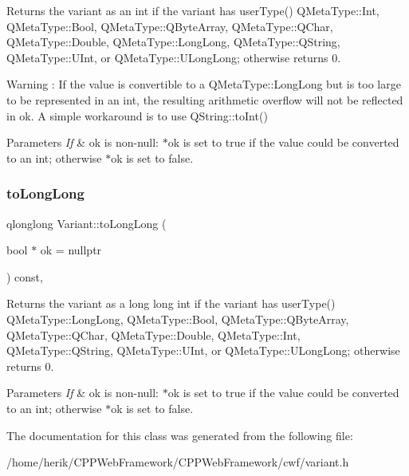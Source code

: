 Returns the variant as an int if the variant has user\+Type() Q\+Meta\+Type\+::\+Int, Q\+Meta\+Type\+::\+Bool, Q\+Meta\+Type\+::\+Q\+Byte\+Array, Q\+Meta\+Type\+::\+Q\+Char, Q\+Meta\+Type\+::\+Double, Q\+Meta\+Type\+::\+Long\+Long, Q\+Meta\+Type\+::\+Q\+String, Q\+Meta\+Type\+::\+U\+Int, or Q\+Meta\+Type\+::\+U\+Long\+Long; otherwise returns 0. 

\begin{DoxyWarning}{Warning}
\+: If the value is convertible to a Q\+Meta\+Type\+::\+Long\+Long but is too large to be represented in an int, the resulting arithmetic overflow will not be reflected in ok. A simple workaround is to use Q\+String\+::to\+Int() 
\end{DoxyWarning}

\begin{DoxyParams}{Parameters}
{\em If} & ok is non-\/null\+: $\ast$ok is set to true if the value could be converted to an int; otherwise $\ast$ok is set to false. \\
\hline
\end{DoxyParams}
\mbox{\label{class_variant_ad6c7084a71cb3189d302160a160bb36b}} 
\subsubsection{\texorpdfstring{to\+Long\+Long}{toLongLong}}
{\footnotesize\ttfamily qlonglong Variant\+::to\+Long\+Long (\begin{DoxyParamCaption}\item[{bool $\ast$}]{ok = {\ttfamily nullptr} }\end{DoxyParamCaption}) const\hspace{0.3cm}{\ttfamily [inline]}, {\ttfamily [slot]}}



Returns the variant as a long long int if the variant has user\+Type() Q\+Meta\+Type\+::\+Long\+Long, Q\+Meta\+Type\+::\+Bool, Q\+Meta\+Type\+::\+Q\+Byte\+Array, Q\+Meta\+Type\+::\+Q\+Char, Q\+Meta\+Type\+::\+Double, Q\+Meta\+Type\+::\+Int, Q\+Meta\+Type\+::\+Q\+String, Q\+Meta\+Type\+::\+U\+Int, or Q\+Meta\+Type\+::\+U\+Long\+Long; otherwise returns 0. 


\begin{DoxyParams}{Parameters}
{\em If} & ok is non-\/null\+: $\ast$ok is set to true if the value could be converted to an int; otherwise $\ast$ok is set to false. \\
\hline
\end{DoxyParams}


The documentation for this class was generated from the following file\+:\begin{DoxyCompactItemize}
\item 
/home/herik/\+C\+P\+P\+Web\+Framework/\+C\+P\+P\+Web\+Framework/cwf/variant.\+h\end{DoxyCompactItemize}
